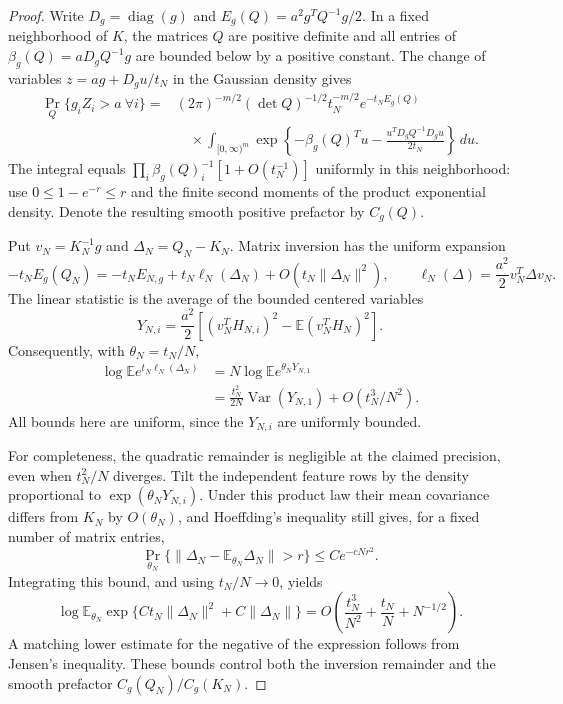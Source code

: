 \begin{proof}
Write $D_g=\operatorname{diag}(g)$ and
$E_g(Q)=a^2g^TQ^{-1}g/2$. In a fixed neighborhood of $K$, the
matrices $Q$ are positive definite and all entries of
$\beta_g(Q)=aD_gQ^{-1}g$ are bounded below by a positive constant.
The change of variables $z=ag+D_gu/t_N$ in the Gaussian density gives
\begin{align*}
 \Pr_{Q}\{g_iZ_i>a\ \forall i\}
 ={}&(2\pi)^{-m/2}(\det Q)^{-1/2}t_N^{-m/2}e^{-t_NE_g(Q)}\\
 &\quad\times\int_{[0,\infty)^m}
  \exp\left\{-\beta_g(Q)^Tu
       -\frac{u^TD_gQ^{-1}D_gu}{2t_N}\right\}\,du.
\end{align*}
The integral equals $\prod_i\beta_g(Q)_i^{-1}[1+O(t_N^{-1})]$
uniformly in this neighborhood: use
$0\le1-e^{-r}\le r$ and the finite second moments of the product
exponential density. Denote the resulting smooth positive prefactor
by $C_g(Q)$.

Put $v_N=K_N^{-1}g$ and $\Delta_N=Q_N-K_N$. Matrix inversion has the
uniform expansion
\[
 -t_NE_g(Q_N)
 =-t_NE_{N,g}+t_N\ell_N(\Delta_N)
                  +O(t_N\|\Delta_N\|^2),
 \qquad
 \ell_N(\Delta)=\frac{a^2}{2}v_N^T\Delta v_N.
\]
The linear statistic is the average of the bounded centered variables
\[
 Y_{N,i}=\frac{a^2}{2}
   \left[(v_N^TH_{N,i})^2-
                   \mathbb E(v_N^TH_N)^2\right].
\]
Consequently, with $\theta_N=t_N/N$,
\begin{align*}
 \log\mathbb E e^{t_N\ell_N(\Delta_N)}
 &=N\log\mathbb E e^{\theta_NY_{N,1}}\\
 &=\frac{t_N^2}{2N}\operatorname{Var}(Y_{N,1})
                              +O(t_N^3/N^2).
\end{align*}
All bounds here are uniform, since the $Y_{N,i}$ are uniformly bounded.

For completeness, the quadratic remainder is negligible at the
claimed precision, even when $t_N^2/N$ diverges. Tilt the independent
feature rows by the density proportional to
$\exp(\theta_NY_{N,i})$. Under this product law their mean covariance
differs from $K_N$ by $O(\theta_N)$, and Hoeffding's inequality still
gives, for a fixed number of matrix entries,
\[
 \Pr_{\theta_N}\{\|\Delta_N-
       \mathbb E_{\theta_N}\Delta_N\|>r\}
       \le C e^{-cNr^2}.
\]
Integrating this bound, and using $t_N/N\to0$, yields
\[
 \log\mathbb E_{\theta_N}
   \exp\{C t_N\|\Delta_N\|^2+C\|\Delta_N\|\}
 =O\left(\frac{t_N^3}{N^2}+\frac{t_N}{N}
                                      +N^{-1/2}\right).
\]
A matching lower estimate for the negative of the expression follows
from Jensen's inequality. These bounds control both the inversion
remainder and the smooth prefactor $C_g(Q_N)/C_g(K_N)$.


\end{proof}
